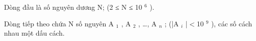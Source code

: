 Dòng đầu là số nguyên dương N; (2 ≤ N ≤ 10 $^ 6 $ ).

Dòng tiếp theo chứa N số nguyên A $_ 1 $ , A $_ 2 $ , …, A $_ n $ ; (|A $_ i $ |$<$10 $^ 9 $ ), các số cách nhau một dấu cách.